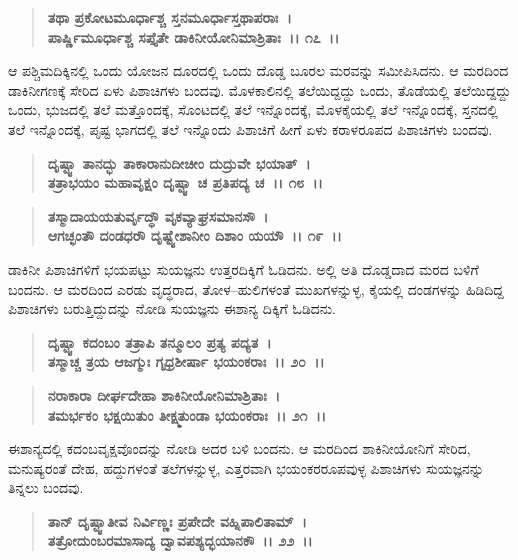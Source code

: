 \begin{verse}
\textbf{ತಥಾ ಪ್ರಕೋಟಮೂರ್ಧಾಶ್ಚ ಸ್ತನಮೂರ್ಧಾಸ್ತಥಾಪರಾಃ~।}\\\textbf{ಪಾರ್ಷ್ಣಿಮೂರ್ಧಾಶ್ಚ ಸಪ್ತೈತೇ ಡಾಕಿನೀಯೋನಿಮಾಶ್ರಿತಾಃ~।। ೧೭~।।}
\end{verse}

ಆ ಪಶ್ಚಿಮದಿಕ್ಕಿನಲ್ಲಿ ಒಂದು ಯೋಜನ ದೂರದಲ್ಲಿ ಒಂದು ದೊಡ್ಡ ಬೂರಲ ಮರವನ್ನು ಸಮೀಪಿಸಿದನು. ಆ ಮರದಿಂದ ಡಾಕಿನೀಗಣಕ್ಕೆ ಸೇರಿದ ಏಳು ಪಿಶಾಚಿಗಳು ಬಂದವು. ಮೊಳಕಾಲಿನಲ್ಲಿ ತಲೆಯಿದ್ದದ್ದು ಒಂದು, ತೊಡೆಯಲ್ಲಿ ತಲೆಯಿದ್ದದ್ದು ಒಂದು, ಭುಜದಲ್ಲಿ ತಲೆ ಮತ್ತೊಂದಕ್ಕೆ, ಸೊಂಟದಲ್ಲಿ ತಲೆ ಇನ್ನೊಂದಕ್ಕೆ, ಮೊಳಕೈಯಲ್ಲಿ ತಲೆ ಇನ್ನೊಂದಕ್ಕೆ, ಸ್ತನದಲ್ಲಿ ತಲೆ ಇನ್ನೊಂದಕ್ಕೆ, ಪೃಷ್ಟ ಭಾಗದಲ್ಲಿ ತಲೆ ಇನ್ನೊಂದು ಪಿಶಾಚಿಗೆ ಹೀಗೆ ಏಳು ಕರಾಳರೂಪದ ಪಿಶಾಚಿಗಳು ಬಂದವು.

\begin{verse}
\textbf{ದೃಷ್ಟ್ವಾ ತಾನದ್ಭು ತಾಕಾರಾನುದೀಚೀಂ ದುದ್ರುವೇ ಭಯಾತ್~।}\\\textbf{ತತ್ರಾಭಯಂ ಮಹಾವೃಕ್ಷಂ ದೃಷ್ಟ್ವಾ ಚ ಪ್ರತಿಪದ್ಯ ಚ~।। ೧೮~।।} 
\end{verse}

\begin{verse}
\textbf{ತಸ್ಮಾದಾಯಯತುರ್ವೃದ್ಧೌ ವೃಕವ್ಯಾಘ್ರಸಮಾನಸೌ~।}\\\textbf{ಆಗಚ್ಛಂತೌ ದಂಡಧರೌ ದೃಷ್ಟ್ವೇಶಾನೀಂ ದಿಶಾಂ ಯಯೌ~।। ೧೯~।।}
\end{verse}

ಡಾಕಿನೀ ಪಿಶಾಚಿಗಳಿಗೆ ಭಯಪಟ್ಟು ಸುಯಜ್ಞನು ಉತ್ತರದಿಕ್ಕಿಗೆ ಓಡಿದನು. ಅಲ್ಲಿ ಅತಿ ದೊಡ್ಡದಾದ ಮರದ ಬಳಿಗೆ ಬಂದನು. ಆ ಮರದಿಂದ ಎರಡು ವೃದ್ಧರಾದ, ತೋಳ–\-ಹುಲಿಗಳಂತೆ ಮುಖಗಳನ್ನುಳ್ಳ, ಕೈಯಲ್ಲಿ ದಂಡಗಳನ್ನು ಹಿಡಿದಿದ್ದ ಪಿಶಾಚಿಗಳು ಬರುತ್ತಿದ್ದುದನ್ನು ನೋಡಿ ಸುಯಜ್ಞನು ಈಶಾನ್ಯ ದಿಕ್ಕಿಗೆ ಓಡಿದನು.

\begin{verse}
\textbf{ದೃಷ್ಟ್ವಾ ಕದಂಬಂ ತತ್ರಾಪಿ ತನ್ಮೂಲಂ ಪ್ರತ್ಯ ಪದ್ಯತ~।}\\\textbf{ತಸ್ಮಾಚ್ಚ ತ್ರಯ ಆಜಗ್ಮುಃ ಗೃಧ್ರಶೀರ್ಷಾ ಭಯಂಕರಾಃ~।। ೨೦~।। }
\end{verse}

\begin{verse}
\textbf{ನರಾಕಾರಾ ದೀರ್ಘದೇಹಾ ಶಾಕಿನೀಯೋನಿಮಾಶ್ರಿತಾಃ~।}\\\textbf{ತಮರ್ಭಕಂ ಭಕ್ಷಯಿತುಂ ತೀಕ್ಷ್ಮತುಂಡಾ ಭಯಂಕರಾಃ~।। ೨೧~।।}
\end{verse}

ಈಶಾನ್ಯದಲ್ಲಿ ಕದಂಬವೃಕ್ಷವೊಂದನ್ನು ನೋಡಿ ಅದರ ಬಳಿ ಬಂದನು. ಆ ಮರದಿಂದ ಶಾಕಿನೀಯೋನಿಗೆ ಸೇರಿದ, ಮನುಷ್ಯರಂತೆ ದೇಹ, ಹದ್ದುಗಳಂತೆ ತಲೆಗಳನ್ನುಳ್ಳ, ಎತ್ತರವಾಗಿ ಭಯಂಕರರೂಪವುಳ್ಳ ಪಿಶಾಚಿಗಳು ಸುಯಜ್ಞನನ್ನು ತಿನ್ನಲು ಬಂದವು.

\begin{verse}
\textbf{ತಾನ್ ದೃಷ್ಟ್ವಾತೀವ ನಿರ್ವಿಣ್ಣಃ ಪ್ರಪೇದೇ ವಹ್ನಿಪಾಲಿತಾಮ್~।}\\\textbf{ತತ್ರೋದುಂಬರಮಾಸಾದ್ಯ ದ್ವಾವಪಶ್ಯದ್ಭಯಾನಕೌ~।। ೨೨~।। }
\end{verse}

